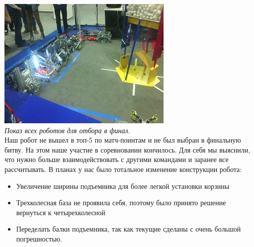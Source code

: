 	\includegraphics{Days/21-24.11.14/11_4_robot.png}\\
	\emph{Показ всех роботов для отбора в финал}.\\
 Наш робот не вышел в топ-5 по матч-поинтам и не был выбран в финальную битву. На этом наше участие в соревновании кончилось. Для себя мы выяснили, что нужно больше взаимодействовать с другими командами и заранее все рассчитывать.
В планах у нас было тотальное изменение конструкции робота:
\begin{itemize}
	\item Увеличение ширины подъемника для более легкой установки корзины
	\item Трехколесная база не проявила себя, поэтому было принято решение вернуться к четырехколесной
	\item Переделать балки подъемника, так как текущие сделаны с очень большой погрешностью. 
\end{itemize}
\fillpage